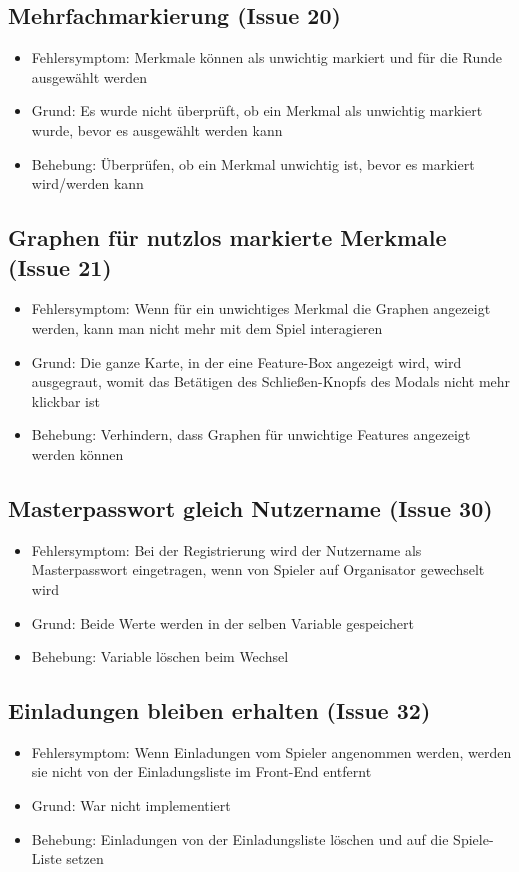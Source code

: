 \documentclass[a4paper]{scrreprt}
\begin{document}
    \subsection{Mehrfachmarkierung (Issue 20)}
    \begin{itemize}
        \item Fehlersymptom: Merkmale können als unwichtig markiert und für die Runde ausgewählt werden
        \item Grund: Es wurde nicht überprüft, ob ein Merkmal als unwichtig markiert wurde, bevor es ausgewählt werden kann
        \item Behebung: Überprüfen, ob ein Merkmal unwichtig ist, bevor es markiert wird/werden kann
    \end{itemize}

    \subsection{Graphen für nutzlos markierte Merkmale (Issue 21)}
    \begin{itemize}
        \item Fehlersymptom: Wenn für ein unwichtiges Merkmal die Graphen angezeigt werden, kann man nicht mehr mit dem Spiel interagieren
        \item Grund: Die ganze Karte, in der eine Feature-Box angezeigt wird, wird ausgegraut, womit das Betätigen des Schließen-Knopfs des Modals nicht mehr klickbar ist
        \item Behebung: Verhindern, dass Graphen für unwichtige Features angezeigt werden können
    \end{itemize}

    \subsection{Masterpasswort gleich Nutzername (Issue 30)}
    \begin{itemize}
        \item Fehlersymptom: Bei der Registrierung wird der Nutzername als Masterpasswort eingetragen, wenn von Spieler auf Organisator gewechselt wird
        \item Grund: Beide Werte werden in der selben Variable gespeichert
        \item Behebung: Variable löschen beim Wechsel
    \end{itemize}

    \subsection{Einladungen bleiben erhalten (Issue 32)}
    \begin{itemize}
        \item Fehlersymptom: Wenn Einladungen vom Spieler angenommen werden, werden sie nicht von der Einladungsliste im Front-End entfernt
        \item Grund: War nicht implementiert
        \item Behebung: Einladungen von der Einladungsliste löschen und auf die Spiele-Liste setzen
    \end{itemize}
\end{document}

